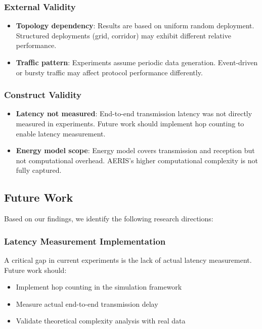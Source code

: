 \subsubsection{External Validity}

\begin{itemize}
    \item \textbf{Topology dependency}: Results are based on uniform
    random deployment. Structured deployments (grid, corridor) may
    exhibit different relative performance.

    \item \textbf{Traffic pattern}: Experiments assume periodic data
    generation. Event-driven or bursty traffic may affect protocol
    performance differently.
\end{itemize}

\subsubsection{Construct Validity}

\begin{itemize}
    \item \textbf{Latency not measured}: End-to-end transmission latency
    was not directly measured in experiments. Future work should implement
    hop counting to enable latency measurement.

    \item \textbf{Energy model scope}: Energy model covers transmission
    and reception but not computational overhead. AERIS's higher
    computational complexity is not fully captured.
\end{itemize}

\subsection{Future Work}

Based on our findings, we identify the following research directions:

\subsubsection{Latency Measurement Implementation}

A critical gap in current experiments is the lack of actual latency
measurement. Future work should:
\begin{itemize}
    \item Implement hop counting in the simulation framework
    \item Measure actual end-to-end transmission delay
    \item Validate theoretical complexity analysis with real data
\end{itemize}

